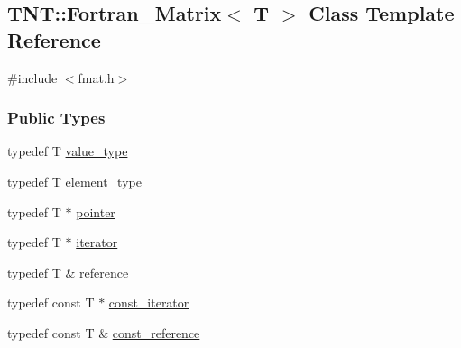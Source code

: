 \subsection{TNT::Fortran\_\-Matrix$<$ T $>$ Class Template Reference}
\label{class_t_n_t_1_1_fortran___matrix}


{\ttfamily \#include $<$fmat.h$>$}

\subsubsection*{Public Types}
\begin{DoxyCompactItemize}
\item 
typedef T \hyperlink{class_t_n_t_1_1_fortran___matrix_a62141b9cb8cc507fc9428eaf47ebe2a5}{value\_\-type}
\item 
typedef T \hyperlink{class_t_n_t_1_1_fortran___matrix_a6b73e97863754a86cad624af6186ef1f}{element\_\-type}
\item 
typedef T $\ast$ \hyperlink{class_t_n_t_1_1_fortran___matrix_a2e1ff91e3d9b097f41b3e773808b5079}{pointer}
\item 
typedef T $\ast$ \hyperlink{class_t_n_t_1_1_fortran___matrix_a43dc25f8986fe19bd84f04e53b4baba7}{iterator}
\item 
typedef T \& \hyperlink{class_t_n_t_1_1_fortran___matrix_a708e0a8fa61611d331137048c3006d5c}{reference}
\item 
typedef const T $\ast$ \hyperlink{class_t_n_t_1_1_fortran___matrix_aa8fa0adc986fcd5bfb1904ad8ca0dabd}{const\_\-iterator}
\item 
typedef const T \& \hyperlink{class_t_n_t_1_1_fortran___matrix_a78f281e015ad8409f1e5e70eea2a04a2}{const\_\-reference}
\end{DoxyCompactItemize}
